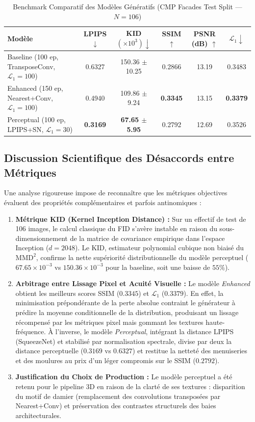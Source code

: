 \documentclass[11pt,a4paper]{report}
\begin{document}
\begin{table}[H]
\centering
\caption{Benchmark Comparatif des Modèles Génératifs (CMP Facades Test Split --- $N = 106$)}
\label{tab:facades_benchmark}
\begin{tabular}{lccccc}
\toprule
\textbf{Modèle} & \textbf{LPIPS $\downarrow$} & \textbf{KID $(\times 10^3) \downarrow$} & \textbf{SSIM $\uparrow$} & \textbf{PSNR (dB) $\uparrow$} & \textbf{$\mathcal{L}_1 \downarrow$} \\
\midrule
Baseline (100 ep, TransposeConv, $\mathcal{L}_1=100$) & 0.6327 & 150.36 $\pm$ 10.25 & 0.2866 & 13.19 & 0.3483 \\
Enhanced (150 ep, Nearest+Conv, $\mathcal{L}_1=100$)  & 0.4940 & 109.86 $\pm$ 9.24  & \textbf{0.3345} & 13.15 & \textbf{0.3379} \\
Perceptual (100 ep, LPIPS+SN, $\mathcal{L}_1=30$)     & \textbf{0.3169} & \textbf{67.65 $\pm$ 5.95} & 0.2792 & 12.69 & 0.3526 \\
\bottomrule
\end{tabular}
\end{table}

\subsection{Discussion Scientifique des Désaccords entre Métriques}
Une analyse rigoureuse impose de reconnaître que les métriques objectives évaluent des propriétés complémentaires et parfois antinomiques :
\begin{enumerate}
    \item \textbf{Métrique KID (Kernel Inception Distance) :} Sur un effectif de test de 106 images, le calcul classique du FID s'avère instable en raison du sous-dimensionnement de la matrice de covariance empirique dans l'espace Inception ($d = 2048$). Le KID, estimateur polynomial cubique non biaisé du $\text{MMD}^2$, confirme la nette supériorité distributionnelle du modèle perceptuel ($67.65 \times 10^{-3}$ vs $150.36 \times 10^{-3}$ pour la baseline, soit une baisse de $55\%$).
    \item \textbf{Arbitrage entre Lissage Pixel et Acuité Visuelle :} Le modèle \emph{Enhanced} obtient les meilleurs scores SSIM ($0.3345$) et $\mathcal{L}_1$ ($0.3379$). En effet, la minimisation prépondérante de la perte absolue contraint le générateur à prédire la moyenne conditionnelle de la distribution, produisant un lissage récompensé par les métriques pixel mais gommant les textures haute-fréquence. À l'inverse, le modèle \emph{Perceptual}, intégrant la distance LPIPS (SqueezeNet) et stabilisé par normalisation spectrale, divise par deux la distance perceptuelle ($0.3169$ vs $0.6327$) et restitue la netteté des menuiseries et des moulures au prix d'un léger compromis sur le SSIM ($0.2792$).
    \item \textbf{Justification du Choix de Production :} Le modèle perceptuel a été retenu pour le pipeline 3D en raison de la clarté de ses textures : disparition du motif de damier (remplacement des convolutions transposées par Nearest+Conv) et préservation des contrastes structurels des baies architecturales.
\end{enumerate}
\end{document}
